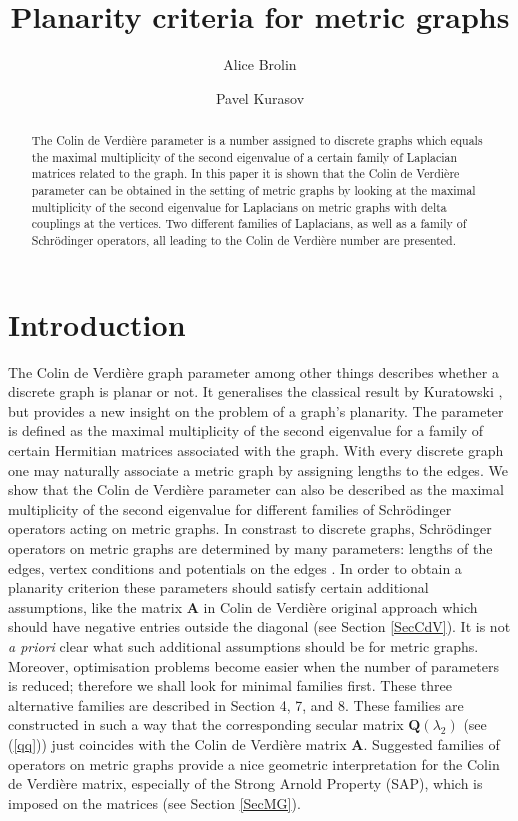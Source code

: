 \documentclass{amsart}
\title{Planarity criteria for metric graphs}
\author{Alice Brolin}
\author{Pavel Kurasov}
\theoremstyle{definition}
\theoremstyle{remark}
\numberwithin{equation}{section}
\begin{document}
\maketitle

\begin{abstract}
The Colin de Verdi\`ere parameter is a number assigned to  discrete graphs which equals the maximal multiplicity of the second eigenvalue of a certain family of 
Laplacian matrices related to the graph. In this paper it is shown that the Colin de Verdi\`ere parameter can be obtained in the setting of metric graphs by looking 
at the maximal multiplicity of the second eigenvalue for Laplacians on metric graphs with delta couplings at the vertices. 
Two different families of Laplacians, as well as a family  of Schr\"odinger operators, all leading to the Colin de Verdi\`ere number are presented.
\end{abstract}



\section{Introduction}

The Colin de Verdi\`ere graph parameter among other things describes whether a 
discrete graph is planar or not. 
It generalises the classical result by Kuratowski \cite{Kuratowski}, but provides a new insight on the problem of a graph's planarity.
The parameter is defined as the maximal multiplicity of the second eigenvalue for a family of  certain Hermitian matrices associated with  the graph. 
With every discrete graph one may naturally associate a metric graph by assigning lengths to the edges.
We show that the Colin de Verdi\`ere 
parameter can also be described as the maximal multiplicity of the second eigenvalue for different families of 
Schr\"odinger operators acting 
on metric graphs. In constrast to discrete graphs, Schr\"odinger operators on metric graphs are determined by many parameters:
lengths of the edges, vertex conditions and potentials on the edges \cite{PK24,BeKu}.
In order to obtain a planarity criterion these parameters should satisfy certain additional assumptions, like the matrix $ \mathbf A $ in
Colin de Verdi\`ere original approach which should have negative entries outside the diagonal (see Section \ref{SecCdV}).
It is not  {\it a priori} clear what such additional assumptions should be  for metric graphs.
Moreover, optimisation problems become easier when the number of parameters is reduced; therefore we shall look for
minimal families first. These three alternative families are described in Section 4, 7, and 8.
These families are constructed in such a way that the corresponding secular matrix $ \mathbf Q(\lambda_2) $ (see (\ref{qq}))
just coincides with the Colin de Verdi\`ere matrix $ \mathbf A$. Suggested families of operators on metric graphs provide a nice geometric interpretation for the Colin de Verdi\`ere matrix,
especially 
 of the Strong Arnold Property (SAP), which is imposed on the  matrices
(see Section \ref{SecMG}).
\end{document}
